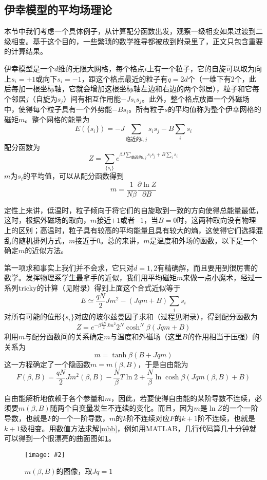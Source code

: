\documentclass[a4paper,11pt]{ctexart}
\newcommand{\beq}{\begin{equation}}
\newcommand{\eeq}{\end{equation}}
\newcommand{\cpic}[2]{
\begin{center}
\texttt{[image: \#2]}
\end{center}
}
\newcommand{\cpicn}[3]
{
\begin{figure}[h!]
\cpic{#1}{#2}
\caption{#3\label{#2}}
\end{figure}
}
\begin{document}
\subsection{伊幸模型的平均场理论}
本节中我们考虑一个具体例子，从计算配分函数出发，观察一级相变如果过渡到二级相变。基于这个目的，一些繁琐的数学推导都被放到附录里了，正文只包含重要的计算结果。\par
伊幸模型是一个$d$维的无限大网格，每个格点$i$上有一个粒子，它的自旋可以取为向上$s_i=+1$或向下$s_i=-1$，距这个格点最近的粒子有$q=2d$个（一维下有2个，此后每加一根坐标轴，它就会增加这根坐标轴左边和右边的两个邻居），粒子和它每个邻居$j$（自旋为$s_j$）间有相互作用能$-Js_is_j$。此外，整个格点放置一个外磁场中，使得每个粒子具有一个外势能$-Bs_i$。所有粒子$s$的平均值称为整个伊幸网格的磁矩$m$。整个网格的能量为
\beq
E(\{s_i\}) = -J\sum_{\text{临近的}i,j} s_i s_j - B \sum_{i} s_i
\eeq
配分函数为
\beq
Z=\sum_{\{s_i\}} e^{\beta J\sum_{\text{临近的}i,j} s_i s_j + B \sum_{i} s_i}
\eeq
$m$为$s_i$的平均值，可以从配分函数得到
\beq
m = \frac{1}{N\beta}\frac{\partial \ln Z}{\partial B}
\eeq
\par
定性上来讲，低温时，粒子倾向于将它们的自旋取到一致的方向使得总能量最低，这时，根据外磁场的取向，$m$接近$+1$或者$-1$，当$B=0$时，这两种取向没有物理上的区别；高温时，粒子具有较高的平均能量且具有较大的熵，这使得它们选择混乱的随机排列方式，$m$接近于0。总的来讲，$m$是温度和外场的函数，以下是一个确定$m$的近似方法。
\par
第一项求和事实上我们并不会求，它只对$d=1,2$有精确解，而且要用到很厉害的数学。发挥物理系学生最拿手的近似，我们用平均磁矩$m$来做一点小魔术，经过一系列tricky的计算（见附录）得到上面这个合式近似等于
\beq
E \simeq \frac{qN}{2}Jm^2 - (Jqm+B)\sum_i s_i
\eeq
对所有可能的位形$\{s_i\}$对应的玻尔兹曼因子求和（过程见附录），得到配分函数为
\beq
Z =  e^{-\beta \frac{qN}{2}Jm^2}2^N\cosh^N\beta(Jqm+B)
\eeq
利用$m$与配分函数间的关系确定$m$与温度和外磁场（这里$B$的作用相当于压强）的关系为
\beq \label{mbb}
m = \tanh\beta(B + Jqm)
\eeq
这一方程确定了一个隐函数$m=m(\beta,B)$，于是自由能为
\beq
F(\beta,B) = \frac{qN}{2}Jm^2(\beta,B) -\frac{N}{\beta} T \ln 2 + \frac{N}{\beta} \ln\cosh\beta(Jqm(\beta,B)+B)
\eeq
\par
自由能解析地依赖于各个参量和$m$，因此，若要使得自由能的某阶导数不连续，必须要$m(\beta,B)$随两个自变量发生不连续的变化。而且，因为$m$是$\ln Z$的一个一阶导数，也就是$F$的一个一阶导数，$m$的$k$阶不连续对应$F$的$k+1$阶不连续，也就是$k+1$级相变。用数值方法求解\cref{mbb}，例如用MATLAB，几行代码算几十分钟就可以得到一个很漂亮的曲面图如\cref{mbetab}。
\cpicn{0.3}{mbetab}{$m(\beta,B)$的图像，取$Jq = 1$}
\end{document}

